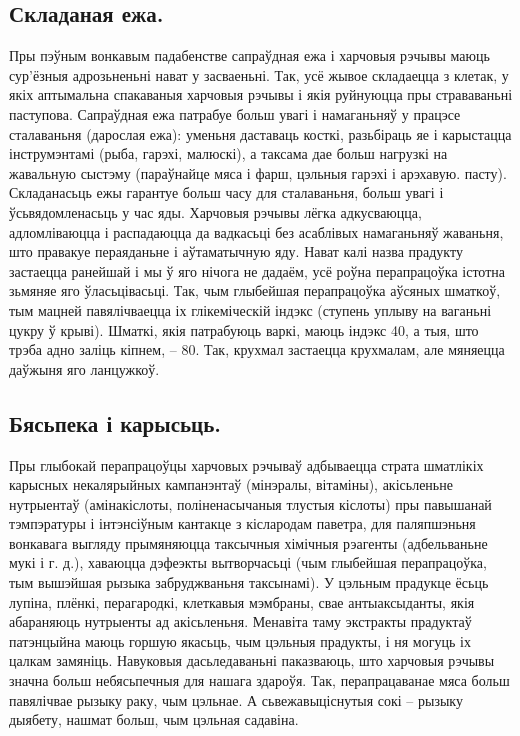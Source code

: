 \subsection{Складаная ежа.}
Пры пэўным вонкавым падабенстве сапраўдная ежа і харчовыя рэчывы маюць сур'ёзныя адрозьненьні нават у засваеньні. Так, усё жывое складаецца з клетак, у якіх аптымальна спакаваныя харчовыя рэчывы і якія руйнуюцца пры страваваньні паступова. Сапраўдная ежа патрабуе больш увагі і намаганьняў у працэсе сталаваньня (дарослая ежа): уменьня даставаць косткі, разьбіраць яе і карыстацца інструмэнтамі (рыба, гарэхі, малюскі), а таксама дае больш нагрузкі на жавальную сыстэму (параўнайце мяса і фарш, цэльныя гарэхі і арэхавую. пасту). Складанасьць ежы гарантуе больш часу для сталаваньня, больш увагі і ўсьвядомленасьць у час яды. Харчовыя рэчывы лёгка адкусваюцца, адломліваюцца і распадаюцца да вадкасьці без асаблівых намаганьняў жаваньня, што правакуе пераяданьне і аўтаматычную яду. Нават калі назва прадукту застаецца ранейшай і мы ў яго нічога не дадаём, усё роўна перапрацоўка істотна зьмяняе яго ўласьцівасьці. Так, чым глыбейшая перапрацоўка аўсяных шматкоў, тым мацней павялічваецца іх глікеміческій індэкс (ступень уплыву на ваганьні цукру ў крыві). Шматкі, якія патрабуюць варкі, маюць індэкс 40, а тыя, што трэба адно заліць кіпнем, – 80. Так, крухмал застаецца крухмалам, але мяняецца даўжыня яго ланцужкоў.

\subsection{Бясьпека і карысьць.}
Пры глыбокай перапрацоўцы харчовых рэчываў адбываецца страта шматлікіх карысных некалярыйных кампанэнтаў (мінэралы, вітаміны), акісьленьне нутрыентаў (амінакіслоты, поліненасычаныя тлустыя кіслоты) пры павышанай тэмпэратуры і інтэнсіўным кантакце з кіслародам паветра, для паляпшэньня вонкавага выгляду прымяняюцца таксычныя хімічныя рэагенты (адбельваньне мукі і г. д.), хаваюцца дэфеэкты вытворчасьці (чым глыбейшая перапрацоўка, тым вышэйшая рызыка забруджваньня таксынамі). У цэльным прадукце ёсьць лупіна, плёнкі, перагародкі, клеткавыя мэмбраны, свае антыаксыданты, якія абараняюць нутрыенты ад акісьленьня. Менавіта таму экстракты прадуктаў патэнцыйна маюць горшую якасьць, чым цэльныя прадукты, і ня могуць іх цалкам замяніць. Навуковыя дасьледаваньні паказваюць, што харчовыя рэчывы значна больш небясьпечныя для нашага здароўя. Так, перапрацаванае мяса больш павялічвае рызыку раку, чым цэльнае. А сьвежавыціснутыя сокі – рызыку дыябету, нашмат больш, чым цэльная садавіна.


